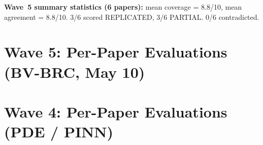 \noindent\textbf{Wave~5 summary statistics (6 papers):}
mean coverage = 8.8/10, mean agreement = 8.8/10.
3/6 scored REPLICATED, 3/6 PARTIAL.
0/6 contradicted.

\iffull
\clearpage
\section*{Wave 5: Per-Paper Evaluations (BV-BRC, May 10)}






\fi

\iffull
\clearpage
\section*{Wave 4: Per-Paper Evaluations (PDE / PINN)}






\fi
